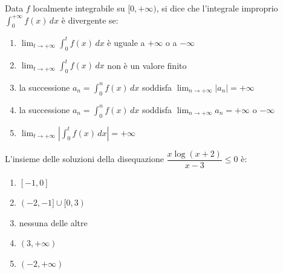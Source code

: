 \begin{quiz}
Data $f$ localmente integrabile su $[0,+\infty)$, si dice che l'integrale improprio $\int_0^{+\infty}f(x)\,dx$ \`e divergente se:
\begin{enumerate}[label=\alph*),leftmargin=1.3cm,itemsep=3pt,topsep=5pt]\item $\lim_{t\to+\infty}\int_0^t f(x)\,dx$ \`e uguale a $+\infty$ o a $-\infty$\item $\lim_{t\to+\infty}\int_0^t f(x)\,dx$ non \`e un valore finito\item la successione $a_n=\int_0^n f(x)\,dx$ soddisfa $\lim_{n\to+\infty}|a_n|=+\infty$\item la successione $a_n=\int_0^n f(x)\,dx$ soddisfa $\lim_{n\to+\infty}a_n=+\infty$ o $-\infty$\item $\lim_{t\to+\infty}\left|\int_0^t f(x)\,dx\right|=+\infty$\end{enumerate}
\end{quiz}

\begin{quiz}
L'insieme delle soluzioni della disequazione $\dfrac{x\log(x+2)}{x-3}\le0$ \`e:
\begin{enumerate}[label=\alph*),leftmargin=1.3cm,itemsep=3pt,topsep=5pt]\item $[-1,0]$\item $(-2,-1]\cup[0,3)$\item nessuna delle altre\item $(3,+\infty)$\item $(-2,+\infty)$\end{enumerate}
\end{quiz}

